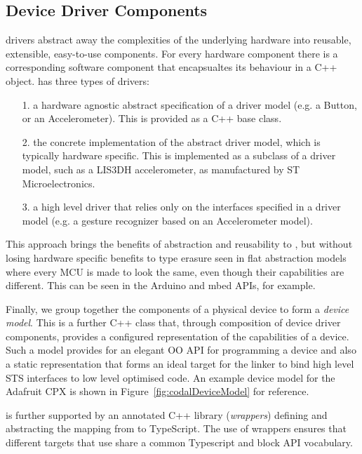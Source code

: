 \subsection{Device Driver Components}
\CO drivers abstract away the complexities of the underlying hardware into reusable, extensible, easy-to-use components. For every hardware component there is a corresponding software component that encapsualtes its behaviour in a C++ object. \CO has three types of drivers:
\begin{itemize}
    \item[1.] a hardware agnostic abstract specification of a driver model (e.g. a Button, or an Accelerometer). This is provided as a C++ base class.
    \item[2.] the concrete implementation of the abstract driver model, which is typically hardware specific. This is implemented as a subclass of a driver model, such as a LIS3DH accelerometer, as manufactured by ST Microelectronics.
    \item[3.] a high level driver that relies only on the interfaces specified in a driver model (e.g. a gesture recognizer based on an Accelerometer model).

\end{itemize}

This approach brings the benefits of abstraction and reusability to \CO, but without losing hardware specific benefits to type erasure seen in flat abstraction models where every MCU is made to look the same, even though their capabilities are different. This can be seen in the Arduino and mbed APIs, for example.

Finally, we group together the components of a physical device to form a \emph{device model}. This is a further C++ class that, through composition of device driver components, provides a configured representation of the capabilities of a device. Such a model provides for an elegant OO API for programming a device and also a static representation that forms an ideal target for the \MCN linker to bind high level STS interfaces to low level optimised code. An example device model for the Adafruit CPX is shown in Figure~\ref{fig:codalDeviceModel} for reference.

 \MCN is further supported by an annotated C++ library (\emph{\MC wrappers}) defining and abstracting the mapping from \CO to TypeScript. The use of \MC wrappers ensures that different \MCN targets that use \CO share a common Typescript and block API vocabulary.

